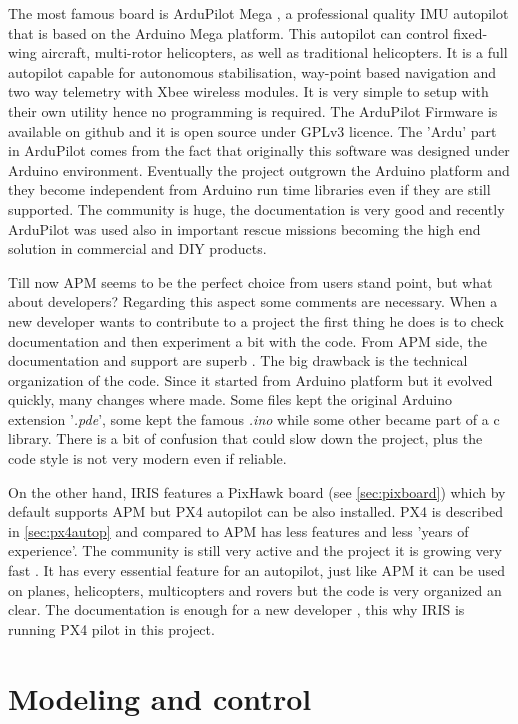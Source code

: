 The most famous board is ArduPilot Mega \cite{ArduP}, a professional quality IMU autopilot that is based on the Arduino Mega platform.  This autopilot can control fixed-wing aircraft, multi-rotor helicopters, as well as traditional helicopters.  It is a full autopilot capable for autonomous stabilisation, way-point based navigation and two way telemetry with Xbee wireless modules. It is very simple to setup with their own utility hence no programming is required. The ArduPilot Firmware \cite{APM} is available on github and it is open source under GPLv3 licence. The 'Ardu' part in ArduPilot comes from the fact that originally this software was designed under Arduino environment. Eventually the project outgrown the Arduino platform and they become independent from Arduino run time libraries even if they are still supported. The community is huge, the documentation is very good and recently ArduPilot was used also in important rescue missions becoming the high end solution in commercial and DIY products.\par Till now APM seems to be the perfect choice from users stand point, but what about developers? Regarding this aspect some comments are necessary. When a new developer wants to contribute to a project the first thing he does is to check documentation and then experiment a bit with the code. From APM side, the documentation and support are superb \cite{APM}. The big drawback is the technical organization of the code. Since it started from Arduino platform but it evolved quickly, many changes where made. Some files kept the original Arduino extension '\textit{.pde}', some kept the famous \textit{.ino} while some other became part of a c library. There is a bit of confusion that could slow down the project, plus the code style is not very modern even if reliable.

On the other hand, IRIS features a PixHawk board (see \ref{sec:pixboard}) which by default supports APM but PX4 autopilot can be also installed. PX4\cite{PX4} is  described in \ref{sec:px4autop} and compared to APM has less features and less 'years of experience'. The community is still very active and the project it is growing very fast \cite{PX4Git}. It has every essential feature for an autopilot, just like APM it can be used on planes, helicopters, multicopters and rovers but the code is very organized an clear. The documentation is enough for a new developer , this why IRIS is running PX4 pilot in this project.

\section{Modeling and control}

